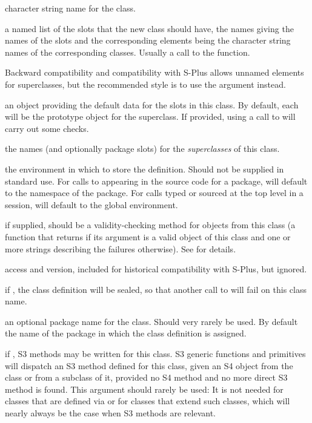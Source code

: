 %
\begin{Arguments}
\begin{ldescription}
\item[\code{Class}] character string name for the class.
\item[\code{representation}]  a named list of the slots that the new class should have, the names giving the names of the slots and the corresponding elements being the character string names of  the corresponding classes.
Usually a call to
the  function.

Backward compatibility and compatibility with S-Plus allows unnamed
elements for superclasses, but the recommended style is to use the
 argument instead.
\item[\code{prototype}]  an object providing the default
data for the slots in this class.  By default, each will be the
prototype object for the superclass.  If provided, using a call to
 will carry out some checks. 
\item[\code{contains}]  the names (and optionally package slots) for the \emph{superclasses} of this class.

\item[\code{where}]  the
environment in which to store the
definition.  Should not be supplied in standard use.  For calls to  appearing in the
source code for a package, will default to the namespace of
the package.  For calls typed or sourced at the top level in a
session, will default to the global environment.

\item[\code{validity}]  if supplied, should be a validity-checking method
for objects from this class (a function that returns  if
its argument is a valid object of this class and one or more strings
describing the failures otherwise).  See 
for details.
\item[\code{access, version}] access and version, included for
historical compatibility with S-Plus, but ignored.
\item[\code{sealed}]  if , the class definition will be sealed,
so that another call to  will fail on this class name.

\item[\code{package}]  an optional package name for the class.  Should very
rarely be used. By default
the name of the package in which the class definition is assigned.

\item[\code{S3methods}] if , S3 methods may be written for this
class.  S3 generic functions and primitives will
dispatch an S3 method defined for this class, given an S4 object
from the class or from a subclass of it, provided no S4
method and no more
direct S3 method is found.  This argument should rarely be used:
It is not needed for
classes that are defined via  or for
classes that extend such classes, which will nearly always be
the case when S3 methods are relevant.

\end{ldescription}
\end{Arguments}
